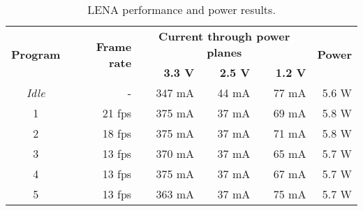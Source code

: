 \begin{table}[h!]
\centering
\begin{tabular}{c|r|rrr|r} \toprule
	\multirow{2}{*}{\textbf{Program}} &
        \multirow{2}{*}{\textbf{Frame rate}} &
        \multicolumn{3}{c|}{\textbf{Current through power planes}} &
        \multirow{2}{*}{\textbf{Power}} \\
        & &
        \textbf{3.3 V} &
        \textbf{2.5 V} &
        \textbf{1.2 V} & \\
	\midrule
	\emph{Idle} & - & 347 mA & 44 mA & 77 mA & 5.6 W \\
	1 & 21 fps & 375 mA & 37 mA & 69 mA & 5.8 W \\
        2 & 18 fps & 375 mA & 37 mA & 71 mA & 5.8 W \\
        3 & 13 fps & 370 mA & 37 mA & 65 mA & 5.7 W \\
        4 & 13 fps & 375 mA & 37 mA & 67 mA & 5.7 W \\
        5 & 13 fps & 363 mA & 37 mA & 75 mA & 5.7 W \\ \bottomrule
\end{tabular}
\caption[LENA results]{LENA performance and power results.}
\label{tab:lena-benchmark-table}
\end{table}

